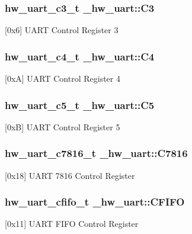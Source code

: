 \subsubsection[{\texorpdfstring{C3}{C3}}]{ {\bf hw\+\_\+uart\+\_\+c3\+\_\+t} \+\_\+hw\+\_\+uart\+::\+C3}\hypertarget{struct__hw__uart_a34917d1cbb907586ee907c259592227b}{}\label{struct__hw__uart_a34917d1cbb907586ee907c259592227b}
\mbox{[}0x6\mbox{]} U\+A\+RT Control Register 3 
\subsubsection[{\texorpdfstring{C4}{C4}}]{ {\bf hw\+\_\+uart\+\_\+c4\+\_\+t} \+\_\+hw\+\_\+uart\+::\+C4}\hypertarget{struct__hw__uart_a43e3b84f43da423f3e8fe84657d01d08}{}\label{struct__hw__uart_a43e3b84f43da423f3e8fe84657d01d08}
\mbox{[}0xA\mbox{]} U\+A\+RT Control Register 4 
\subsubsection[{\texorpdfstring{C5}{C5}}]{ {\bf hw\+\_\+uart\+\_\+c5\+\_\+t} \+\_\+hw\+\_\+uart\+::\+C5}\hypertarget{struct__hw__uart_afc88abd96a70cfed15fb537f227a5a14}{}\label{struct__hw__uart_afc88abd96a70cfed15fb537f227a5a14}
\mbox{[}0xB\mbox{]} U\+A\+RT Control Register 5 
\subsubsection[{\texorpdfstring{C7816}{C7816}}]{ {\bf hw\+\_\+uart\+\_\+c7816\+\_\+t} \+\_\+hw\+\_\+uart\+::\+C7816}\hypertarget{struct__hw__uart_ad22f7b4fa6bc736b0df91c011200cb8d}{}\label{struct__hw__uart_ad22f7b4fa6bc736b0df91c011200cb8d}
\mbox{[}0x18\mbox{]} U\+A\+RT 7816 Control Register 
\subsubsection[{\texorpdfstring{C\+F\+I\+FO}{CFIFO}}]{ {\bf hw\+\_\+uart\+\_\+cfifo\+\_\+t} \+\_\+hw\+\_\+uart\+::\+C\+F\+I\+FO}\hypertarget{struct__hw__uart_a70eb25eede6fed244a2a6d7c9b7be9a8}{}\label{struct__hw__uart_a70eb25eede6fed244a2a6d7c9b7be9a8}
\mbox{[}0x11\mbox{]} U\+A\+RT F\+I\+FO Control Register 
